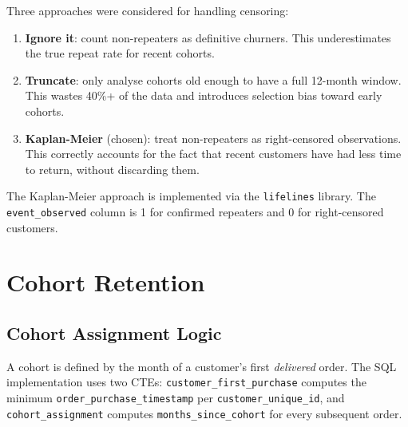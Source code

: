 \begin{decisionbox}
Three approaches were considered for handling censoring:
\begin{enumerate}
  \item \textbf{Ignore it}: count non-repeaters as definitive churners. This
    underestimates the true repeat rate for recent cohorts.
  \item \textbf{Truncate}: only analyse cohorts old enough to have a full 12-month
    window. This wastes 40\%+ of the data and introduces selection bias toward early cohorts.
  \item \textbf{Kaplan-Meier} (chosen): treat non-repeaters as right-censored
    observations. This correctly accounts for the fact that recent customers have
    had less time to return, without discarding them.
\end{enumerate}
The Kaplan-Meier approach is implemented via the \texttt{lifelines} library.
The \texttt{event\_observed} column is 1 for confirmed repeaters and 0 for
right-censored customers.
\end{decisionbox}

\section{Cohort Retention}
\label{sec:ecom-cohorts}


\subsection{Cohort Assignment Logic}

A cohort is defined by the month of a customer's first \emph{delivered} order.
The SQL implementation uses two CTEs: \texttt{customer\_first\_purchase} computes
the minimum \texttt{order\_purchase\_timestamp} per \texttt{customer\_unique\_id},
and \texttt{cohort\_assignment} computes \texttt{months\_since\_cohort} for every
subsequent order.


